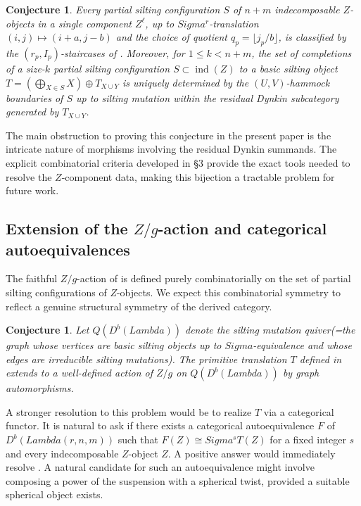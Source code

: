 \documentclass[11pt, a4paper]{article}
\newtheorem{conjecture}[theorem]{Conjecture}
\theoremstyle{definition}
\def\Lambda{Lambda}%
\def\Sigma{Sigma}%
\def\mathbb#1{#1}%
\def\mathcal#1{#1}%
\def\Db{D^b}%
\newcommand{\Db}{\mathcal{D}^b}
\begin{document}
\begin{conjecture}\label{conj:silt-vs-config}
Every partial silting configuration $S$ of $n+m$ indecomposable $\mathcal Z$-objects in a single component $\mathcal Z^\ell$, up to $\Sigma^r$-translation $(i,j)\mapsto(i+a,j-b)$ and the choice of quotient $q_p = \lfloor j_p / b \rfloor$, is classified by the $(r_p, I_p)$-staircases of . Moreover, for $1 \le k < n+m$, the set of completions of a size-$k$ partial silting configuration $S \subset \operatorname{ind}(\mathcal Z)$ to a basic silting object $T = (\bigoplus_{X \in S} X) \oplus T_{\mathcal X \cup \mathcal Y}$ is uniquely determined by the $(U,V)$-hammock boundaries of $S$ up to silting mutation within the residual Dynkin subcategory generated by $T_{\mathcal X \cup \mathcal Y}$.
\end{conjecture}

The main obstruction to proving this conjecture in the present paper is the intricate nature of morphisms involving the residual Dynkin summands. The explicit combinatorial criteria developed in \S 3 provide the exact tools needed to resolve the $\mathcal Z$-component data, making this bijection a tractable problem for future work.

\subsection{Extension of the \texorpdfstring{$\mathbb Z/g$}{Z/g}-action and categorical autoequivalences}\label{subsec:future-Taction}

The faithful $\mathbb Z/g$-action of  is defined purely combinatorially on the set of partial silting configurations of $\mathcal Z$-objects. We expect this combinatorial symmetry to reflect a genuine structural symmetry of the derived category.

\begin{conjecture}\label{conj:T-silting}
Let $Q(\Db(\Lambda))$ denote the silting mutation quiver(=the graph whose vertices are basic silting objects up to $\Sigma$-equivalence and whose edges are irreducible silting mutations). The primitive translation $T$ defined in  extends to a well-defined action of $\mathbb Z/g$ on $Q(\Db(\Lambda))$ by graph automorphisms.
\end{conjecture}

A stronger resolution to this problem would be to realize $T$ via a categorical functor. It is natural to ask if there exists a categorical autoequivalence $F$ of $\Db(\Lambda(r,n,m))$ such that $F(Z) \cong \Sigma^s T(Z)$ for a fixed integer $s$ and every indecomposable $\mathcal Z$-object $Z$. A positive answer would immediately resolve . A natural candidate for such an autoequivalence might involve composing a power of the suspension with a spherical twist, provided a suitable spherical object exists.
\end{document}
